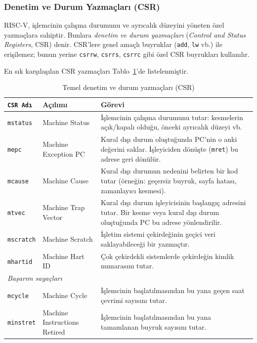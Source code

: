 \subsubsection{Denetim ve Durum Yazmaçları (CSR)}

RISC-V, işlemcinin çalışma durumunu ve ayrıcalık düzeyini yöneten özel yazmaçlara sahiptir. Bunlara \emph{denetim ve durum yazmaçları} (\emph{Control and Status Registers}, CSR) denir. CSR'lere genel amaçlı buyruklar (\texttt{add}, \texttt{lw} vb.) ile erişilemez; bunun yerine \texttt{csrrw}, \texttt{csrrs}, \texttt{csrrc} gibi özel CSR buyrukları kullanılır.

En sık karşılaşılan CSR yazmaçları Tablo~\ref{tab:csr-yazmaclari}'de listelenmiştir.

\begin{table}[H]
\centering
\caption[Temel CSR yazmaçları]{Temel denetim ve durum yazmaçları (CSR)}
\label{tab:csr-yazmaclari}
\small
\begin{tabular}{llp{7.5cm}}
\toprule
\texttt{CSR Adı} & Açılımı & Görevi \\
\midrule
\texttt{mstatus}  & Machine Status      & İşlemcinin çalışma durumunu tutar: kesmelerin açık/kapalı olduğu, önceki ayrıcalık düzeyi vb. \\
\texttt{mepc}     & Machine Exception PC & Kural dışı durum oluştuğunda PC'nin o anki değerini saklar. İşleyiciden dönüşte (\texttt{mret}) bu adrese geri dönülür. \\
\texttt{mcause}   & Machine Cause        & Kural dışı durumun nedenini belirten bir kod tutar (örneğin: geçersiz buyruk, sayfa hatası, zamanlayıcı kesmesi). \\
\texttt{mtvec}    & Machine Trap Vector  & Kural dışı durum işleyicisinin başlangıç adresini tutar. Bir kesme veya kural dışı durum oluştuğunda PC bu adrese yönlendirilir. \\
\texttt{mscratch} & Machine Scratch      & İşletim sistemi çekirdeğinin geçici veri saklayabileceği bir yazmaçtır. \\
\texttt{mhartid}  & Machine Hart ID      & Çok çekirdekli sistemlerde çekirdeğin kimlik numarasını tutar. \\
\midrule
\multicolumn{3}{l}{\emph{Başarım sayaçları}} \\
\midrule
\texttt{mcycle}    & Machine Cycle        & İşlemcinin başlatılmasından bu yana geçen saat çevrimi sayısını tutar. \\
\texttt{minstret}  & Machine Instructions Retired & İşlemcinin başlatılmasından bu yana tamamlanan buyruk sayısını tutar. \\
\bottomrule
\end{tabular}
\end{table}

